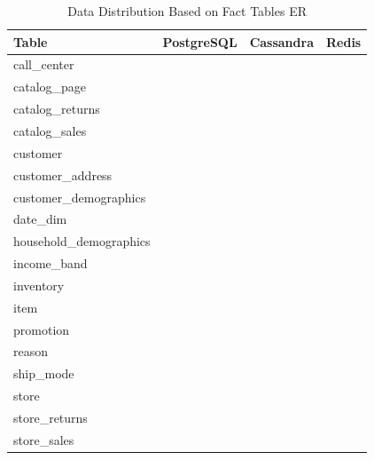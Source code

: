 \documentclass[conference]{IEEEtran}
\begin{document}
\begin{table}[htbp]
	\caption{Data Distribution Based on Fact Tables ER}
	\begin{center}
		\begin{tabular}{|l|c|c|c|}
			\hline
			\textbf{Table}          & \textbf{PostgreSQL} & \textbf{Cassandra} & \textbf{Redis} \\
			\hline
			call\_center            &                     & \checkmark         &                \\
			catalog\_page           &                     & \checkmark         &                \\
			catalog\_returns        &                     & \checkmark         &                \\
			catalog\_sales          &                     & \checkmark         &                \\
			customer                & \checkmark          & \checkmark         & \checkmark     \\
			customer\_address       & \checkmark          & \checkmark         & \checkmark     \\
			customer\_demographics  & \checkmark          & \checkmark         & \checkmark     \\
			date\_dim               & \checkmark          & \checkmark         & \checkmark     \\
			household\_demographics & \checkmark          & \checkmark         & \checkmark     \\
			income\_band            & \checkmark          & \checkmark         & \checkmark     \\
			inventory               & \checkmark          &                    &                \\
			item                    & \checkmark          & \checkmark         & \checkmark     \\
			promotion               & \checkmark          & \checkmark         & \checkmark     \\
			reason                  & \checkmark          & \checkmark         & \checkmark     \\
			ship\_mode              &                     & \checkmark         & \checkmark     \\
			store                   & \checkmark          &                    &                \\
			store\_returns          & \checkmark          &                    &                \\
			store\_sales            & \checkmark          &                    &                \\

\end{tabular}
\end{center}
\end{table}
\end{document}

